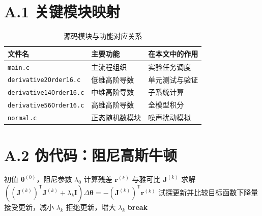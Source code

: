 \section*{A.1 关键模块映射}
\begin{table}[H]
\centering
\caption{源码模块与功能对应关系}
\begin{tabular}{lll}
\toprule
文件名 & 主要功能 & 在本文中的作用 \\
\midrule
\texttt{main.c} & 主流程组织 & 实验任务调度 \\
\texttt{derivative2Order16.c} & 低维高阶导数 & 单元测试与验证 \\
\texttt{derivative14Order16.c} & 中维高阶导数 & 子系统计算 \\
\texttt{derivative56Order16.c} & 高维高阶导数 & 全模型积分 \\
\texttt{normal.c} & 正态随机数模块 & 噪声扰动模拟 \\
\bottomrule
\end{tabular}
\end{table}

\section*{A.2 伪代码：阻尼高斯牛顿}
\begin{algorithm}[H]
\caption{阻尼高斯牛顿参数估计}
\begin{algorithmic}[1]
\Require 初值 $\boldsymbol{\theta}^{(0)}$，阻尼参数 $\lambda_0$
\State 计算残差 $\mathbf{r}^{(k)}$ 与雅可比 $\mathbf{J}^{(k)}$
\State 求解 $\left((\mathbf{J}^{(k)})^\mathsf{T}\mathbf{J}^{(k)}+\lambda_k\mathbf{I}\right)\Delta\boldsymbol{\theta}=- (\mathbf{J}^{(k)})^\mathsf{T}\mathbf{r}^{(k)}$
\State 试探更新并比较目标函数下降量
\State 接受更新，减小 $\lambda_k$
\Else
\State 拒绝更新，增大 $\lambda_k$
\EndIf
{}
\State \textbf{break}
\EndIf
\EndFor
\end{algorithmic}
\end{algorithm}
